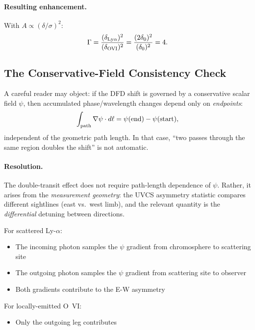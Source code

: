 \paragraph{Resulting enhancement.}
With $A \propto (\delta/\sigma)^2$:
\begin{equation}
\Gamma = \frac{(\delta_{\rm Ly\alpha})^2}{(\delta_{\rm OVI})^2} = \frac{(2\delta_0)^2}{(\delta_0)^2} = 4.
\end{equation}

\subsection{The Conservative-Field Consistency Check}

A careful reader may object: if the DFD shift is governed by a conservative 
scalar field $\psi$, then accumulated phase/wavelength changes depend only on 
\emph{endpoints}:
\begin{equation}
\int_{\rm path} \nabla\psi \cdot d\ell = \psi(\text{end}) - \psi(\text{start}),
\end{equation}
independent of the geometric path length. In that case, ``two passes through 
the same region doubles the shift'' is not automatic.

\paragraph{Resolution.}
The double-transit effect does not require path-length dependence of $\psi$. 
Rather, it arises from the \emph{measurement geometry}: the UVCS asymmetry 
statistic compares different sightlines (east vs.\ west limb), and the relevant 
quantity is the \emph{differential} detuning between directions.

For scattered Ly-$\alpha$:
\begin{itemize}[nosep]
\item The incoming photon samples the $\psi$ gradient from chromosphere to 
scattering site
\item The outgoing photon samples the $\psi$ gradient from scattering site to 
observer
\item Both gradients contribute to the E-W asymmetry
\end{itemize}

For locally-emitted O~VI:
\begin{itemize}[nosep]
\item Only the outgoing leg contributes
\end{itemize}

